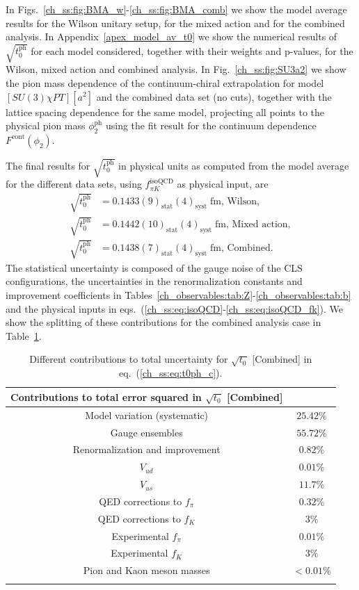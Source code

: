 In Figs.~\ref{ch_ss:fig:BMA_w}-\ref{ch_ss:fig:BMA_comb} we show the model average results for the Wilson unitary setup, for the mixed action and for the combined analysis. In Appendix~\ref{apex_model_av_t0} we show the numerical results of $\sqrt{t_0^{\textrm{ph}}}$ for each model considered, together with their weights and p-values, for the Wilson, mixed action and combined analysis. In Fig.~\ref{ch_ss:fig:SU3a2} we show the pion mass dependence of the continuum-chiral extrapolation for model $[SU(3)\chi PT][a^2]$ and the combined data set (no cuts), together with the lattice spacing dependence for the same model, projecting all points to the physical pion mass $\phi_2^{\textrm{ph}}$ using the fit result for the continuum dependence $F^{\textrm{cont}}(\phi_2)$.

The final results for $\sqrt{t_0^{\textrm{ph}}}$ in physical units as computed from the model average for the different data sets, using $f_{\pi K}^{\textrm{isoQCD}}$ as physical input, are
\begin{align}
\label{ch_ss:eq:t0ph_w}
\sqrt{t_0^{\textrm{ph}}}&=0.1433(9)_{\textrm{stat}}(4)_{\textrm{syst}}\;\textrm{fm, Wilson}, \\
\label{ch_ss:eq:t0ph_tm}
\sqrt{t_0^{\textrm{ph}}}&=0.1442(10)_{\textrm{stat}}(4)_{\textrm{syst}}\;\textrm{fm, Mixed action}, \\
\label{ch_ss:eq:t0ph_c}
\sqrt{t_0^{\textrm{ph}}}&=0.1438(7)_{\textrm{stat}}(4)_{\textrm{syst}}\;\textrm{fm, Combined}.
\end{align}
The statistical uncertainty is composed of the gauge noise of the CLS configurations, the uncertainties in the renormalization constants and improvement coefficients in Tables~\ref{ch_observables:tab:Z}-\ref{ch_observables:tab:b} and the physical inputs in eqs.~(\ref{ch_ss:eq:isoQCD}-\ref{ch_ss:eq:isoQCD_fk}). We show the splitting of these contributions for the combined analysis case in Table~\ref{ch_ss:tab:stat}.

\begin{longtable}{c c}
\label{ch_ss:tab:stat}
	Contributions to total error squared in $\sqrt{t_0}$ [Combined] & \\
	\toprule
	Model variation (systematic) & $25.42\%$ \\
	Gauge ensembles & $55.72\%$ \\
	Renormalization and improvement & $0.82\%$ \\
	$V_{ud}$ & $0.01\%$ \\
	$V_{us}$ & $11.7\%$ \\
	QED corrections to $f_{\pi}$ & $0.32\%$ \\
	QED corrections to $f_K$ & $3\%$ \\
	Experimental $f_{\pi}$ & $0.01\%$ \\
	Experimental $f_K$ & $3\%$ \\
	Pion and Kaon meson masses & $<0.01\%$ \\
    \bottomrule
    \caption{Different contributions to total uncertainty for $\sqrt{t_0}$ [Combined] in eq.~(\ref{ch_ss:eq:t0ph_c}).}
\end{longtable}

